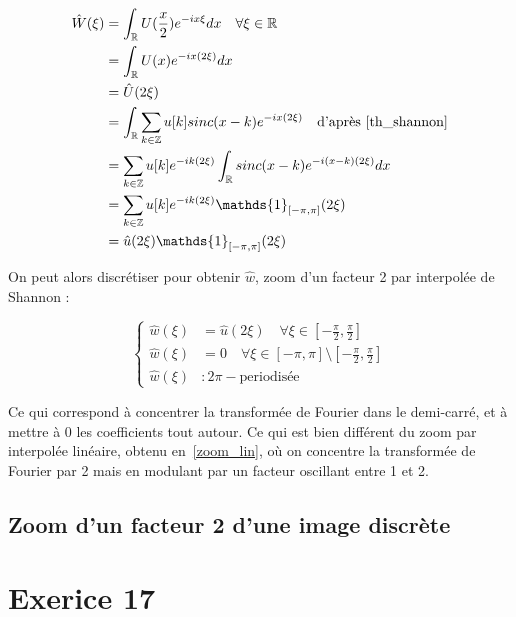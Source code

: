 \documentclass[12pt,a4paper,onecolumn]{article}
\begin{document}
\begin{equation}
	\begin{split}
		\hat{W}(\xi) &= \int_{\mathbb{R}}U(\frac{x}{2})e^{-ix\xi}dx \quad \forall \xi \in \mathbb{R}\\
		&= \int_{\mathbb{R}}U(x)e^{-ix(2\xi)}dx\\
		&= \hat{U}(2\xi)\\
		&=  \int_{\mathbb{R}}\sum_{k\in\mathbb{Z}} u[k]sinc(x-k) e^{-ix(2\xi)} \quad \text{d'après \eqref{th_shannon}}\\
		&= \sum_{k\in\mathbb{Z}} u[k] e^{-ik(2\xi)}\int_{\mathbb{R}} sinc(x-k) e^{-i(x-k)(2\xi)}dx\\
		&= \sum_{k\in\mathbb{Z}} u[k] e^{-ik(2\xi)} \mathds{1}_{[-\pi, \pi]}(2\xi)\\
		&= \hat{u}(2\xi)\mathds{1}_{[-\pi, \pi]}(2\xi)\\
	\end{split}
\end{equation}

On peut alors discrétiser pour obtenir \(\hat{w}\), zoom d'un facteur 2 par interpolée de Shannon :

\begin{equation}
	\left\{
	\begin{split}
		\hat{w}(\xi) &= \hat{u}(2\xi) \quad \forall \xi \in [-\frac{\pi}{2}, \frac{\pi}{2}]\\
		\hat{w}(\xi) &= 0 \quad \forall \xi \in [-\pi, \pi] \setminus [-\frac{\pi}{2}, \frac{\pi}{2}]\\
		\hat{w}(\xi) &: 2\pi-\text{periodisée}
	\end{split}
	\right.
	\label{zoom_shannon}
\end{equation}

Ce qui correspond à concentrer la transformée de Fourier dans le demi-carré, et à mettre à 0 les coefficients tout autour. Ce qui est bien différent du zoom par interpolée linéaire, obtenu en~\eqref{zoom_lin}, où on concentre la transformée de Fourier par 2 mais en modulant par un facteur oscillant entre 1 et 2.

\subsection{Zoom d'un facteur 2 d'une image discrète}





\setcounter{section}{16}
\section{Exerice 17}
\end{document}
